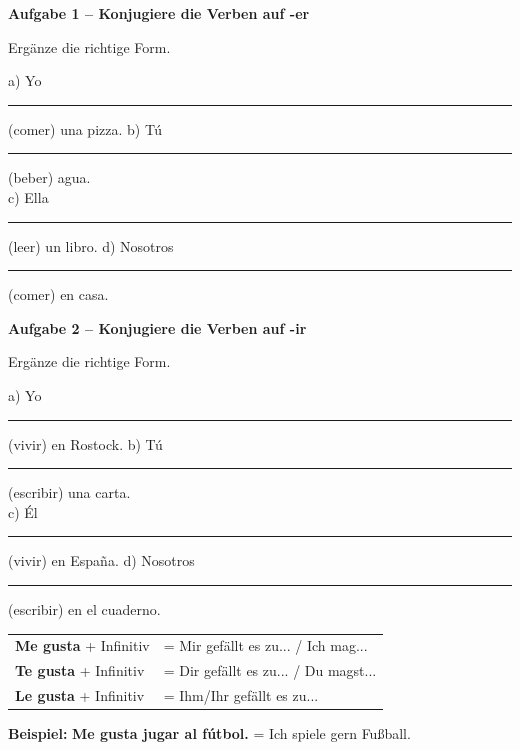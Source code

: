 \documentclass[11pt, a4paper]{article}
\newcommand{\fachfarbe}{spanisch}
\newcommand{\punktebox}[1]{\hfill\fbox{\small \_/#1}}
\newcommand{\luecke}[1]{\rule{#1}{0.4pt}}
\newenvironment{aufgabe}[1]{%
    \needspace{5\baselineskip}%
    \nopagebreak[4]%
    \vspace{10pt}
    \noindent\textbf{\textcolor{\fachfarbe}{Aufgabe #1}}
    \nopagebreak[4]%
    \vspace{5pt}
    \nopagebreak[4]%
    \begin{list}{}{\leftmargin=0pt}
    \item[]
}{%
    \end{list}
}
\newcommand{\es}[1]{\textcolor{\fachfarbe}{\textbf{#1}}}
\begin{document}
\vspace{10pt}


\begin{aufgabe}{1 -- Konjugiere die Verben auf -er}
Ergänze die richtige Form. \punktebox{4}
\end{aufgabe}

\noindent
a) Yo \luecke{2.5cm} (comer) una pizza. \hfill
b) Tú \luecke{2.5cm} (beber) agua. \\[0.8em]
c) Ella \luecke{2.5cm} (leer) un libro. \hfill
d) Nosotros \luecke{2.5cm} (comer) en casa. \\

\vspace{10pt}


\begin{aufgabe}{2 -- Konjugiere die Verben auf -ir}
Ergänze die richtige Form. \punktebox{4}
\end{aufgabe}

\noindent
a) Yo \luecke{2.5cm} (vivir) en Rostock. \hfill
b) Tú \luecke{2.5cm} (escribir) una carta. \\[0.8em]
c) Él \luecke{2.5cm} (vivir) en España. \hfill
d) Nosotros \luecke{2.5cm} (escribir) en el cuaderno. \\

\vspace{10pt}


\begin{merkkasten}

\begin{tabular}{ll}
\es{Me gusta} + Infinitiv & = Mir gefällt es zu... / Ich mag... \\
\es{Te gusta} + Infinitiv & = Dir gefällt es zu... / Du magst... \\
\es{Le gusta} + Infinitiv & = Ihm/Ihr gefällt es zu... \\
\end{tabular}

\vspace{0.5em}
\textbf{Beispiel:} \es{Me gusta jugar al fútbol.} = Ich spiele gern Fußball.

\end{merkkasten}
\end{document}
